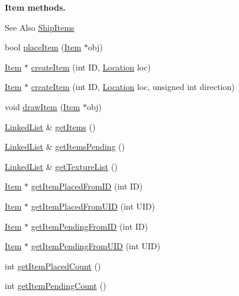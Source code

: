 \begin{Indent}{\bf Item methods.}\par
{\em \begin{DoxySeeAlso}{See Also}
\hyperlink{classShipItems}{Ship\-Items} 
\end{DoxySeeAlso}
}\begin{DoxyCompactItemize}
\item 
bool \hyperlink{classShipMaster_aa9e9c11a116929e94bee491ab8dacf49}{place\-Item} (\hyperlink{classItem}{Item} $\ast$obj)
\item 
\hyperlink{classItem}{Item} $\ast$ \hyperlink{classShipMaster_a0e90a2352a439464d922d3fda25d71ca}{create\-Item} (int I\-D, \hyperlink{structLocation}{Location} loc)
\item 
\hyperlink{classItem}{Item} $\ast$ \hyperlink{classShipMaster_a07e5d7b5b90d5c5efc405175a3e93c3b}{create\-Item} (int I\-D, \hyperlink{structLocation}{Location} loc, unsigned int direction)
\item 
void \hyperlink{classShipMaster_ab378e743c7200449d2ac6d3b2c6c8f63}{draw\-Item} (\hyperlink{classItem}{Item} $\ast$obj)
\item 
\hyperlink{classLinkedList}{Linked\-List} \& \hyperlink{classShipMaster_a627afea5fc5988ad18c8a2dc4dcc7d91}{get\-Items} ()
\item 
\hyperlink{classLinkedList}{Linked\-List} \& \hyperlink{classShipMaster_a28b969e9befa8df4df7fcf253aa3a119}{get\-Items\-Pending} ()
\item 
\hyperlink{classLinkedList}{Linked\-List} \& \hyperlink{classShipMaster_a4095febdcd811f31f8af7e512cc30962}{get\-Texture\-List} ()
\item 
\hyperlink{classItem}{Item} $\ast$ \hyperlink{classShipMaster_a4e343f85e8732b670e37eb10793b9da5}{get\-Item\-Placed\-From\-I\-D} (int I\-D)
\item 
\hyperlink{classItem}{Item} $\ast$ \hyperlink{classShipMaster_aa6014ba22783d814119df0b8a45f4a3b}{get\-Item\-Placed\-From\-U\-I\-D} (int U\-I\-D)
\item 
\hyperlink{classItem}{Item} $\ast$ \hyperlink{classShipMaster_a49034c4d14496165dafa091998f9ed92}{get\-Item\-Pending\-From\-I\-D} (int I\-D)
\item 
\hyperlink{classItem}{Item} $\ast$ \hyperlink{classShipMaster_af65799a876a14901fdb2e385a35b32b2}{get\-Item\-Pending\-From\-U\-I\-D} (int U\-I\-D)
\item 
int \hyperlink{classShipMaster_a46e23864a829801068f1e1a9fca0ef82}{get\-Item\-Placed\-Count} ()
\item 
int \hyperlink{classShipMaster_a3581bacb31233e22e0ae5c372b4bdb7c}{get\-Item\-Pending\-Count} ()
\end{DoxyCompactItemize}
\end{Indent}
